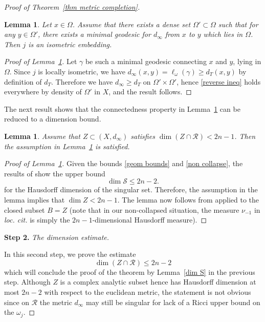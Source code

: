 \documentclass[a4paper,11pt,leqno,english]{smfart}
\theoremstyle{plain}
\theoremstyle{plain}
\numberwithin{equation}{section} %
\numberwithin{figure}{section} %
\theoremstyle{plain}
\theoremstyle{plain}
\newtheorem{lem}[thm]{Lemma} %
\theoremstyle{remark}
\theoremstyle{remark}
\theoremstyle{definition}
\theoremstyle{plain}
\theoremstyle{plain}
\theoremstyle{definition}
\newcommand{\cS}{{\mathcal{S}}}
\newcommand{\cR}{\mathcal R}
\renewcommand{\ge}{\geq}
\renewcommand{\le}{\leq}
\begin{document}
\begin{proof}[Proof of Theorem~\ref{thm metric completion}]
\begin{lem}
\label{convexity}
Let $x\in \Omega$. Assume that there exists a dense set $\Omega'\subset \Omega$ such that for any $y\in \Omega'$, there exists a minimal geodesic for $d_\infty$ from $x$ to $y$ which lies in $\Omega$. Then $j$ is an isometric embedding.
\end{lem}

\begin{proof}[Proof of Lemma~\ref{convexity}]
Let $\gamma$ be such a minimal geodesic connecting $x$ and $y$, lying in $\Omega$. Since $j$ is locally isometric, we have
$d_\infty(x,y)=\ell_\omega(\gamma) \ge d_T(x,y)$
by definition of $d_T$. Therefore we have  $d_\infty\ge d_T$ on $\Omega'\times \Omega'$, hence \eqref{reverse ineq} holds everywhere by density of $\Omega' $ in $X$, and the result follows. 
\end{proof}

The next result shows that the connectedness property in Lemma~\ref{convexity} can be reduced to a dimension bound. 

\begin{lem}
\label{dimbdd}
Assume that $Z\subset (X,d_\infty)$ satisfies $\dim(Z\cap \cR) <2n-1$. Then the assumption in Lemma~\ref{convexity} is satisfied. 
\end{lem}

\begin{proof}[Proof of Lemma~\ref{dimbdd}]
Given the bounds \eqref{geom bounds} and \eqref{non collapse},  the results of \cite{CCI} show the upper bound 
\begin{equation}
\label{dim S} 
\dim \cS \le 2n-2.
\end{equation}
for the Hausdorff dimension of the singular set. Therefore, the assumption in the lemma implies that $\dim Z<2n-1$. 
The lemma now follows from \cite[Theorem~3.7]{CCII} applied to the closed subset $B=Z$ (note that in our non-collapsed situation, the measure $\nu_{-1}$ in {\it loc. cit.} is simply the $2n-1$-dimensional Hausdorff measure). 
\end{proof}

\bigskip

{\bf Step 2. } {\it The dimension estimate.}

\medskip

In this second step, we prove the estimate
\begin{equation}
\label{dim Z}
\dim(Z\cap \cR) \le 2n-2
\end{equation}
which will conclude the proof of the theorem by Lemma~\ref{dim S} in the previous step. Although $Z$ is a complex analytic subset hence has Hausdorff dimension at most $2n-2$ with respect to the euclidean metric, the statement is not obvious since on $\cR$ the metric $d_\infty$ may still be singular for lack of a Ricci upper bound on the $\omega_j$.


\end{proof}
\end{document}
